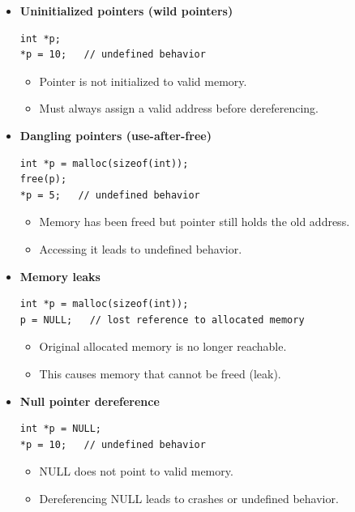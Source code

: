 \documentclass[10pt]{article}
\begin{document}
\begin{itemize}

\item \textbf{Uninitialized pointers (wild pointers)}
\begin{verbatim}
int *p;
*p = 10;   // undefined behavior
\end{verbatim}

\begin{itemize}
    \item Pointer is not initialized to valid memory.
    \item Must always assign a valid address before dereferencing.
\end{itemize}

\item \textbf{Dangling pointers (use-after-free)}
\begin{verbatim}
int *p = malloc(sizeof(int));
free(p);
*p = 5;   // undefined behavior
\end{verbatim}

\begin{itemize}
    \item Memory has been freed but pointer still holds the old address.
    \item Accessing it leads to undefined behavior.
\end{itemize}

\item \textbf{Memory leaks}
\begin{verbatim}
int *p = malloc(sizeof(int));
p = NULL;   // lost reference to allocated memory
\end{verbatim}

\begin{itemize}
    \item Original allocated memory is no longer reachable.
    \item This causes memory that cannot be freed (leak).
\end{itemize}

\item \textbf{Null pointer dereference}
\begin{verbatim}
int *p = NULL;
*p = 10;   // undefined behavior
\end{verbatim}

\begin{itemize}
    \item NULL does not point to valid memory.
    \item Dereferencing NULL leads to crashes or undefined behavior.
\end{itemize}


\end{itemize}
\end{document}
